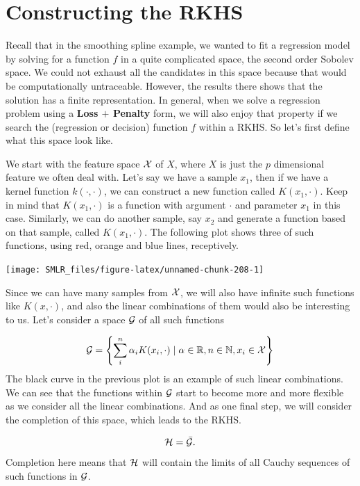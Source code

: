 \documentclass[
]{book}
\theoremstyle{definition}
\theoremstyle{definition}
\theoremstyle{definition}
\theoremstyle{definition}
\theoremstyle{remark}
\begin{document}
\hypertarget{constructing-the-rkhs}{%
\section{Constructing the RKHS}\label{constructing-the-rkhs}}

Recall that in the smoothing spline example, we wanted to fit a regression model by solving for a function \(f\) in a quite complicated space, the second order Sobolev space. We could not exhaust all the candidates in this space because that would be computationally untraceable. However, the results there shows that the solution has a finite representation. In general, when we solve a regression problem using a \textbf{Loss \(+\) Penalty} form, we will also enjoy that property if we search the (regression or decision) function \(f\) within a RKHS. So let's first define what this space look like.

We start with the feature space \(\cal X\) of \(X\), where \(X\) is just the \(p\) dimensional feature we often deal with. Let's say we have a sample \(x_1\), then if we have a kernel function \(k(\cdot, \cdot)\), we can construct a new function called \(K(x_1, \cdot)\). Keep in mind that \(K(x_1, \cdot)\) is a function with argument \(\cdot\) and parameter \(x_1\) in this case. Similarly, we can do another sample, say \(x_2\) and generate a function based on that sample, called \(K(x_1, \cdot)\). The following plot shows three of such functions, using red, orange and blue lines, receptively.

\begin{center}\texttt{[image: SMLR\_files/figure-latex/unnamed-chunk-208-1]} \end{center}

Since we can have many samples from \(\cal X\), we will also have infinite such functions like \(K(x, \cdot)\), and also the linear combinations of them would also be interesting to us. Let's consider a space \({\cal G}\) of all such functions

\[{\cal G} = \left\{\sum_{i}^n \alpha_i K(x_i, \cdot) \mid \alpha \in \mathbb{R}, n \in \mathbb{N}, x_i \in {\cal X} \right\} \]
The black curve in the previous plot is an example of such linear combinations. We can see that the functions within \({\cal G}\) start to become more and more flexible as we consider all the linear combinations. And as one final step, we will consider the completion of this space, which leads to the RKHS.

\[\cal H = \bar{\cal G}.\]
Completion here means that \(\cal H\) will contain the limits of all Cauchy sequences of such functions in \(\cal G\).
\end{document}
